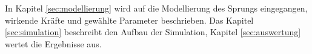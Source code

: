 In Kapitel \ref{sec:modellierung} wird auf die Modellierung des Sprungs eingegangen, wirkende Kräfte und gewählte Parameter beschrieben. Das Kapitel \ref{sec:simulation} beschreibt den Aufbau der Simulation, Kapitel \ref{sec:auswertung} wertet die Ergebnisse aus.

\newpage
